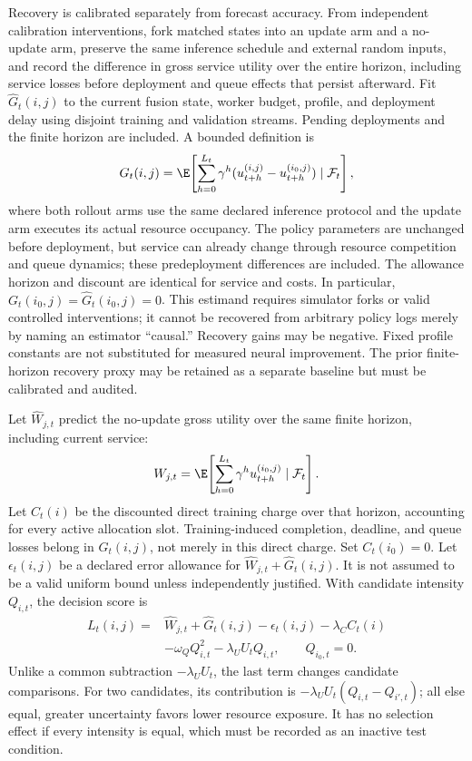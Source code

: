 Recovery is calibrated separately from forecast accuracy. From independent
calibration interventions, fork matched states into an update arm and a no-update
arm, preserve the same inference schedule and external random inputs, and record
the difference in gross service utility over the entire horizon, including
service losses before deployment and queue effects that persist afterward. Fit
$\widehat G_t(i,j)$ to the current fusion state, worker budget, profile, and
deployment delay using disjoint training and validation streams. Pending
deployments and the finite horizon are included. A bounded definition is
\begin{equation}
 G_t(i,j)=\E\!\left[
 \sum_{h=0}^{L_t}\gamma^{h}
  (u_{t+h}^{(i,j)}-u_{t+h}^{(i_0,j)})\mid\mathcal F_t\right],
 \label{eq:measured-recovery}
\end{equation}
where both rollout arms use the same declared inference protocol and the
update arm executes its actual resource occupancy. The policy parameters are
unchanged before deployment, but service can already change through resource
competition and queue dynamics; these predeployment differences are included.
The allowance horizon and discount are identical for service and costs.
In particular, $G_t(i_0,j)=\widehat G_t(i_0,j)=0$.
This estimand requires simulator forks or valid controlled interventions; it
cannot be recovered from arbitrary policy logs merely by naming an estimator
``causal.'' Recovery gains may be negative. Fixed profile constants are not
substituted for measured neural improvement. The prior finite-horizon recovery
proxy may be retained as a separate baseline but must be calibrated and audited.

Let $\widehat W_{j,t}$ predict the no-update gross utility over the same
finite horizon, including current service:
\begin{equation}
 W_{j,t}=\E\!\left[\sum_{h=0}^{L_t}\gamma^h
 u_{t+h}^{(i_0,j)}\mid\mathcal F_t\right].
\end{equation}
Let $C_t(i)$ be the discounted direct training charge over that horizon,
accounting for every active allocation slot. Training-induced completion,
deadline, and queue losses belong in $G_t(i,j)$, not merely in this direct
charge. Set $C_t(i_0)=0$. Let
$\epsilon_t(i,j)$ be a declared error allowance for
$\widehat W_{j,t}+\widehat G_t(i,j)$. It is not assumed to be a valid uniform
bound unless independently justified. With candidate intensity $Q_{i,t}$,
the decision score is
\begin{align}
 L_t(i,j)={}&\widehat W_{j,t}+\widehat G_t(i,j)-\epsilon_t(i,j)
             -\lambda_C C_t(i)\nonumber\\
            &-\omega_Q Q_{i,t}^2-\lambda_U U_t Q_{i,t},
 \qquad Q_{i_0,t}=0.
 \label{eq:candidate-score}
\end{align}
Unlike a common subtraction $-\lambda_U U_t$, the last term changes candidate
comparisons. For two candidates, its contribution is
$-\lambda_U U_t(Q_{i,t}-Q_{i',t})$; all else equal, greater uncertainty favors
lower resource exposure. It has no selection effect if every intensity is equal,
which must be recorded as an inactive test condition.

